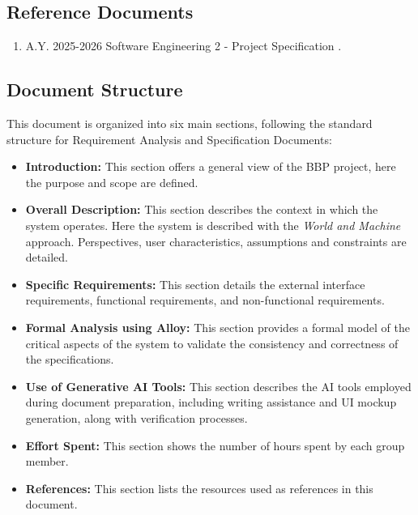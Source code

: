 \subsection{Reference Documents}
\begin{enumerate}
    \item A.Y. 2025-2026 Software Engineering 2 - Project Specification \cite{project_spec}.
\end{enumerate}

\subsection{Document Structure}
This document is organized into six main sections, following the standard structure for Requirement Analysis and Specification Documents:

\begin{itemize}
    \item[] \textbf{Introduction:} This section offers a general view of the BBP project, here the purpose and scope are defined.
    \item[] \textbf{Overall Description:} This section describes the context in which the system operates. Here the system is described with the \textit{World and Machine} approach. Perspectives, user characteristics, assumptions and constraints are detailed.
    \item[] \textbf{Specific Requirements:} This section details the external interface requirements, functional requirements, and non-functional requirements.
    \item[] \textbf{Formal Analysis using Alloy:} This section provides a formal model of the critical aspects of the system to validate the consistency and correctness of the specifications.
    \item[] \textbf{Use of Generative AI Tools:} This section describes the AI tools employed during document preparation, including writing assistance and UI mockup generation, along with verification processes.
    \item[] \textbf{Effort Spent:} This section shows the number of hours spent by each group member.
    \item[] \textbf{References:} This section lists the resources used as references in this document.
\end{itemize}